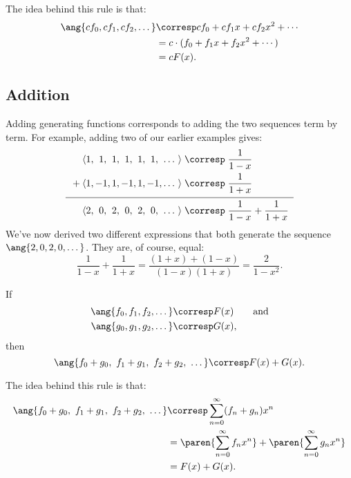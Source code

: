 The idea behind this rule is that:
\begin{align*}
\ang{c f_0, c f_1, c f_2, \dots}
    & \corresp c f_0 + c f_1 x + c f_2 x^2 + \cdots \\
    & = c \cdot (f_0 + f_1 x + f_2 x^2 + \cdots) \\
    & = c F(x).
\end{align*}

\subsection{Addition}

Adding generating functions corresponds to adding the two sequences
term by term.  For example, adding two of our earlier examples gives:
%
\[
\begin{array}{c@{}c@{}c@{\,}c@{\,}c@{\,}c@{\,}c@{\,}c@{\,}c@{\,}c@{\;}c@{\;}l}
  & \langle & 1, & 1, & 1, & 1, & 1, & 1, & \dots & \rangle &
    \corresp & \dfrac{1}{1-x} \\[8pt]
{}+{} & \langle & 1, & -1, & 1, & -1, & 1, & -1, & \dots & \rangle &
    \corresp & \dfrac{1}{1+x} \\[8pt]
\hline
\noalign{\vskip3pt}
& \langle & 2, & 0, & 2, & 0, & 2, & 0, & \dots & \rangle &
    \corresp & \dfrac{1}{1-x} + \dfrac{1}{1+x}
\end{array}
\]
%
We've now derived two different expressions that both generate the
sequence $\ang{2, 0, 2, 0, \dots}$.  They are, of course, equal:
%
\[
\frac{1}{1-x} + \frac{1}{1+x}
    = \frac{(1 + x) + (1 - x)}{(1-x)(1+x)} = \frac{2}{1-x^2}.
\]

\begin{rul}
\label{rule:addition}
If
%
\begin{align*}
\ang{f_0, f_1, f_2, \dots} & \corresp F(x) \qquad \text{and} \\
\ang{g_0, g_1, g_2, \dots} & \corresp G(x),
\end{align*}
%
then
%
\[
\ang{f_0 + g_0,\ f_1 + g_1,\ f_2 + g_2,\ \dots}
    \corresp F(x) + G(x).
\]
\end{rul}

The idea behind this rule is that:
\begin{align*}
\ang{f_0 + g_0,\ f_1 + g_1,\ f_2 + g_2,\ \dots}
    & \corresp \sum_{n=0}^\infty (f_n + g_n) x^n \\
    & = \paren{\sum_{n=0}^\infty f_n x^n} +
        \paren{\sum_{n=0}^\infty g_n x^n} \\
    & = F(x) + G(x).
\end{align*}

